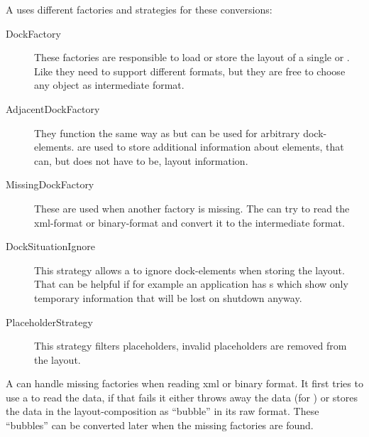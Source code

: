 
A  uses different factories and strategies for these conversions:
\begin{description}
 \item[DockFactory] These factories are responsible to load or store the layout of a single  or . Like  they need to support different formats, but they are free to choose any object as intermediate format.
 \item[AdjacentDockFactory] They function the same way as  but can be used for arbitrary dock-elements.  are used to store additional information about elements, that can, but does not have to be, layout information.
 \item[MissingDockFactory] These are used when another factory is missing. The  can try to read the xml-format or binary-format and convert it to the intermediate format.
 \item[DockSituationIgnore] This strategy allows a  to ignore dock-elements when storing the layout. That can be helpful if for example an application has s which show only temporary information that will be lost on shutdown anyway.
 \item[PlaceholderStrategy] This strategy filters placeholders, invalid placeholders are removed from the layout.
 \end{description}

A  can handle missing factories when reading xml or binary format. It first tries to use a  to read the data, if that fails it either throws away the data (for ) or stores the data in the layout-composition as ``bubble'' in its raw format. These ``bubbles'' can be converted later when the missing factories are found.



